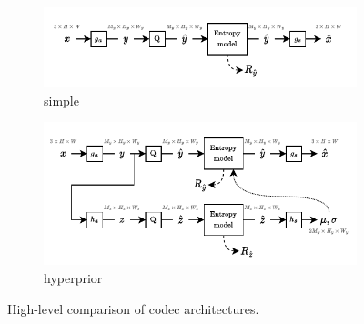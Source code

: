 \begin{figure}[htbp]
  \centering
  \begin{subfigure}[b]{1.0\linewidth}
    \centering
    \includegraphics[width=\linewidth]{img/introduction/arch-overview-factorized.pdf}
    \caption{simple}
    \label{fig:intro/arch-comparison/factorized}
  \end{subfigure}%
  \vspace{1.5\baselineskip}
  \begin{subfigure}[b]{1.0\linewidth}
    \centering
    \includegraphics[width=\linewidth]{img/introduction/arch-overview-hyperprior.pdf}
    \caption{hyperprior}
    \label{fig:intro/arch-comparison/hyperprior}
  \end{subfigure}%
  \caption[High-level comparison of codec architectures]{%
    High-level comparison of codec architectures.%
  }
  \label{fig:intro/arch-comparison}
\end{figure}


